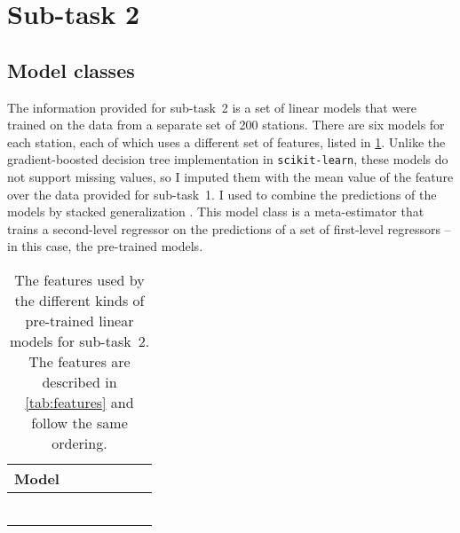 
\section{Sub-task 2}
\label{sec:st2}

\subsection{Model classes}
\label{sec:st2:model-classes}

The information provided for sub-task~2 is a set of linear models that were trained on
the data from a separate set of 200 stations.
There are six models for each station, each of which uses a different set of features,
listed in \cref{tab:st2:features-rlm}.
Unlike the gradient-boosted decision tree implementation in \texttt{scikit-learn},
these models do not support missing values, so I imputed them with the mean value of
the feature over the data provided for sub-task~1.
I used  to combine the predictions of the models
by stacked generalization \parencite{Wolpert1992}.
This model class is a meta-estimator that trains a second-level regressor on the
predictions of a set of first-level regressors -- in this case, the pre-trained models.

\begin{table}
  \centering
  \newcommand{\rlmtablerow}[7]{#1 & #7 & #2 & #3 & #4 & #5 & #6 \\}
  \begin{tabular}{lllllll}

    \rlmtablerow{Model}{\coldiag{\bikesh{}}}{\coldiag{\bikesavgfull{}}}{\coldiag{\bikesavgshort{}}}{\coldiag{\bikeshdiffavgfull{}}}{\coldiag{\bikeshdiffavgshort{}}}{\coldiag{\texttt{temperature}}}

    \midrule

    \rlmtablerow{\rlmfull{}}{\checkmark}{\checkmark}{}{\checkmark}{}{}

    \rlmtablerow{\rlmfulltemp{}}{\checkmark}{\checkmark}{}{\checkmark}{}{\checkmark}

    \rlmtablerow{\rlmshort{}}{\checkmark}{}{\checkmark}{}{\checkmark}{}

    \rlmtablerow{\rlmshortfull{}}{\checkmark}{\checkmark}{\checkmark}{\checkmark}{\checkmark}{}

    \rlmtablerow{\rlmshortfulltemp{}}{\checkmark}{\checkmark}{\checkmark}{\checkmark}{\checkmark}{\checkmark}

    \rlmtablerow{\rlmshorttemp{}}{\checkmark}{}{\checkmark}{}{\checkmark}{\checkmark}

    \bottomrule
  \end{tabular}
  \caption{The features used by the different kinds of pre-trained linear
    models for sub-task~2.
    The features are described in \cref{tab:features} and follow the same ordering.
  }
  \label{tab:st2:features-rlm}
\end{table}

